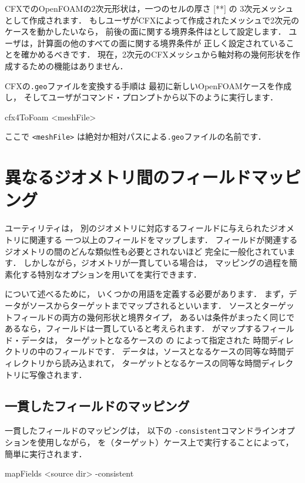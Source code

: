 CFXでのOpenFOAMの2次元形状は，一つのセルの厚さ [**] の
3次元メッシュとして作成されます．
もしユーザがCFXによって作成されたメッシュで2次元のケースを動かしたいなら，
前後の面に関する境界条件はとして設定します．
ユーザは，計算面の他のすべての面に関する境界条件が
正しく設定されていることを確かめるべきです．
現在，2次元のCFXメッシュから軸対称の幾何形状を作成するための機能はありません．

CFXの\texttt{.geo}ファイルを変換する手順は
最初に新しいOpenFOAMケースを作成し，
そしてユーザがコマンド・プロンプトから以下のように実行します．
\begin{OFverbatim}[terminal]
cfx4ToFoam <meshFile>
\end{OFverbatim}
ここで \texttt{<meshFile>} は絶対か相対パスによる\texttt{.geo}ファイルの名前です．



\section{異なるジオメトリ間のフィールドマッピング}
\label{sec:5.6}
%
%
ユーティリティは，
別のジオメトリに対応するフィールドに与えられたジオメトリに関連する
一つ以上のフィールドをマップします．
フィールドが関連するジオメトリの間のどんな類似性も必要とされないほど
完全に一般化されています．
しかしながら，ジオメトリが一貫している場合は，
マッピングの過程を簡素化する特別なオプションを用いてを実行できます．

について述べるために，
いくつかの用語を定義する必要があります．
まず，データがソースからターゲットまでマップされるといいます．
ソースとターゲットフィールドの両方の幾何形状と境界タイプ，
あるいは条件がまったく同じであるなら，フィールドは一貫していると考えられます．
がマップするフィールド・データは，
ターゲットとなるケースの
%
%
の
によって指定された
時間ディレクトリの中のフィールドです．
データは，ソースとなるケースの同等な時間ディレクトリから読み込まれて，
ターゲットとなるケースの同等な時間ディレクトリに写像されます．


\subsection{一貫したフィールドのマッピング}
\label{ssec:5.6.1}
一貫したフィールドのマッピングは，
以下の \texttt{-consistent}コマンドラインオプションを使用しながら，
%
%
を（ターゲット）ケース上で実行することによって，
簡単に実行されます．
\begin{OFverbatim}[terminal]
mapFields <source dir> -consistent
\end{OFverbatim}

